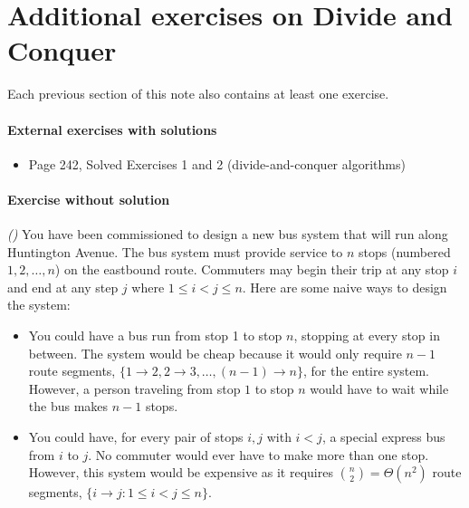 
\section{Additional exercises on Divide and Conquer}

Each previous section of this note also contains at least one exercise.

\paragraph{External exercises with solutions}

\begin{itemize}
\item \KT Page 242, Solved Exercises 1 and 2 (divide-and-conquer algorithms)
\end{itemize}
 
\paragraph{Exercise without solution}

\newcommand{\seg}[2]{#1\!\to\! #2}

\exercise\label{dc: exercise: bus routes} \emph{()}
You have been commissioned to design a new bus system that will run along Huntington Avenue.  The bus system must provide service to $n$ stops (numbered $1,2,\ldots,n$) on the eastbound route.  Commuters may begin their trip at any stop $i$ and end at any step $j$ where $1\le i < j \le n$.  Here are some naive ways to design the system:
\begin{itemize}
\item You could have a bus run from stop 1 to stop $n$, stopping at every stop in between. The system would be cheap because it would only require $n-1$ route segments, $\{\seg 1 2, \seg 2 3, \ldots, \seg{(n-1)}n\}$, for the entire system. However, a person traveling from stop $1$ to stop $n$ would have to wait while the bus makes $n-1$ stops.

\item You could have, for every pair of stops $i, j$ with $i < j$, a special express bus from $i$ to $j$.
  No commuter would ever have to make more than one stop.
  However, this system would be expensive as it requires ${n \choose 2} = \Theta(n^2)$ route segments,
  $\{\seg i j : 1\le i < j \le n\}$.
  
\end{itemize}

